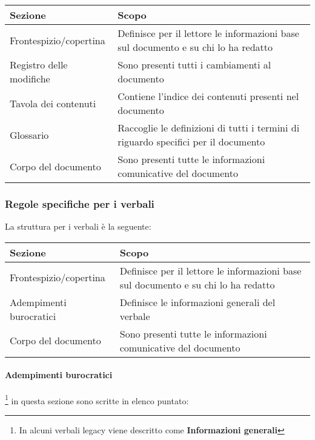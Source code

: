 \begin{center}
    \begin{tabularx}{\linewidth}{l | X }            
        \textbf{Sezione} & \textbf{Scopo}\\
        \hline
        Frontespizio/copertina & Definisce per il lettore le informazioni base sul documento e su chi lo ha redatto\\
        Registro delle modifiche & Sono presenti tutti i cambiamenti al documento\\
        Tavola dei contenuti & Contiene l'indice dei contenuti presenti nel documento \\
        Glossario & Raccoglie le definizioni di tutti i termini di riguardo specifici per il documento\\
        Corpo del documento & Sono presenti tutte le informazioni comunicative del documento\\
    \end{tabularx}
\end{center}

\subsubsection{Regole specifiche per i verbali}

La struttura per i verbali è la seguente:

\begin{center}
    \begin{tabularx}{\linewidth}{l | X }            
        \textbf{Sezione} & \textbf{Scopo}\\
        \hline
        Frontespizio/copertina & Definisce per il lettore le informazioni base sul documento e su chi lo ha redatto\\
        Adempimenti burocratici & Definisce le informazioni generali del verbale\\
        Corpo del documento & Sono presenti tutte le informazioni comunicative del documento\\
    \end{tabularx}
\end{center}

\paragraph{Adempimenti burocratici}\footnote{In alcuni verbali legacy viene descritto come \textbf{Informazioni generali}} in questa sezione sono scritte in elenco puntato:

